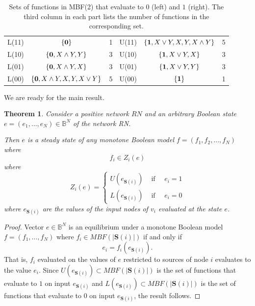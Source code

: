 \documentclass[10pt,letterpaper]{article}
\newcommand{\bbB}{\mathbb{B}}
\newcommand{\Sources}{\mathbf{S}}
\newcommand{\bzero}{{\bf 0}}
\newcommand{\bone}{{\bf 1}}
\newtheorem{thm}{Theorem}[section]
\begin{document}
\begin{table}[t]
    \centering
    \begin{tabular}{|c|c|c ||c|c|c|}
     \hline 
     L(11)   & $\{ \bzero\}$                     &1 & U(11) &  $\{\bone,X\vee Y, X,Y,X\wedge Y \}$ &5     \\
     L(10)  & $\{\bzero, X\wedge Y, Y\} $        &3  & U(10) &  $\{\bone ,X\vee Y, X \}   $        &3  \\
     L(01)  & $\{\bzero,X\wedge Y, X \} $        &3  & U(01) &  $ \{\bone, X\vee Y, Y\}  $         &3 \\
     L(00)  & $\{\bzero,X\wedge Y, X,Y,X\vee Y \}$ &5 & U(00) &   $\{ \bone \} $                    &1\\
     \hline
    \end{tabular}
    \caption{Sets of functions in MBF(2) that evaluate to $0$ (left) and $1$ (right). The third column in each part lists the number of functions in the corresponding set. }
    \label{tableMBF2}
\end{table}

We are ready for the main result. 

\begin{thm}\label{thm:monostability}
Consider a positive network $RN$ and an arbitrary Boolean state $e=(e_1, \ldots, e_N)\in \bbB^N$ of the network RN.

Then $e$ is a steady state of any monotone Boolean model $f=(f_1,f_2, \ldots, f_N)$ where
\[ f_i \in Z_i(e)\]
where 
\[ Z_i(e)= \left\{ \begin{array}{cc}
U(e_{\Sources(i)}) & \mbox{ if } \quad e_i=1\\
L(e_{\Sources(i)}) &\mbox{ if } \quad e_i=0
\end{array}
\right .
\]
where $e_{\Sources(i)}$ are the values of the input nodes of $v_i$ evaluated at the state $e$.
\end{thm}
\begin{proof}
Vector $e\in \bbB^N$ is an equilibrium under a monotone Boolean model $f=(f_1, \ldots, f_N)$ where $f_i \in MBF(|\Sources(i)|)$ if and only if 
\[ e_i = f_i(e_{\Sources(i)}). \]
That is, $f_i$ evaluated on the values of $e$ restricted to sources of node $i$ evaluates to the value $e_i$.
Since $U(e_{\Sources(i)}) \subset MBF(|\Sources(i)|)$ is the set of functions that evaluate to $1$ on input $e_{\Sources(i)}$ and $L(e_{\Sources(i)}) \subset MBF(|\Sources(i)|)$ is the set of functions that evaluate to $0$ on input $e_{\Sources(i)}$, the result follows.
\end{proof}
\end{document}
